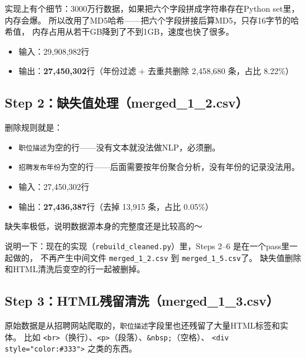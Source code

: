 \documentclass[12pt,a4paper]{ctexart}
\begin{document}
实现上有个细节：3000万行数据，如果把六个字段拼成字符串存在Python set里，内存会爆。
所以改用了MD5哈希——把六个字段拼接后算MD5，只存16字节的哈希值，
内存占用从若干GB降到了不到1GB，速度也快了很多。

\begin{itemize}
\item 输入：29,908,982行
\item 输出：\textbf{27,450,302}行（年份过滤 + 去重共删除 2,458,680 条，占比 8.22\%）
\end{itemize}


\subsection{Step 2：缺失值处理（merged\_1\_2.csv）}

删除规则就是：
\begin{itemize}
\item \texttt{职位描述}为空的行——没有文本就没法做NLP，必须删。
\item \texttt{招聘发布年份}为空的行——后面需要按年份聚合分析，没有年份的记录没法用。
\end{itemize}

\begin{itemize}
\item 输入：27,450,302行
\item 输出：\textbf{27,436,387}行（去掉 13,915 条，占比 0.05\%）
\end{itemize}

缺失率极低，说明数据源本身的完整度还是比较高的～

说明一下：现在的实现（\texttt{rebuild\_cleaned.py}）里，Steps 2--6 是在一个pass里一起做的，
不再产生中间文件 \texttt{merged\_1\_2.csv} 到 \texttt{merged\_1\_5.csv}了。
缺失值删除和HTML清洗后变空的行一起被删掉。


\subsection{Step 3：HTML残留清洗（merged\_1\_3.csv）}

原始数据是从招聘网站爬取的，\texttt{职位描述}字段里也还残留了大量HTML标签和实体。
比如 \texttt{<br>}（换行）、\texttt{<p>}（段落）、\texttt{\&nbsp;}（空格）、
\texttt{<div style="color:\#333">} 之类的东西。
\end{document}
